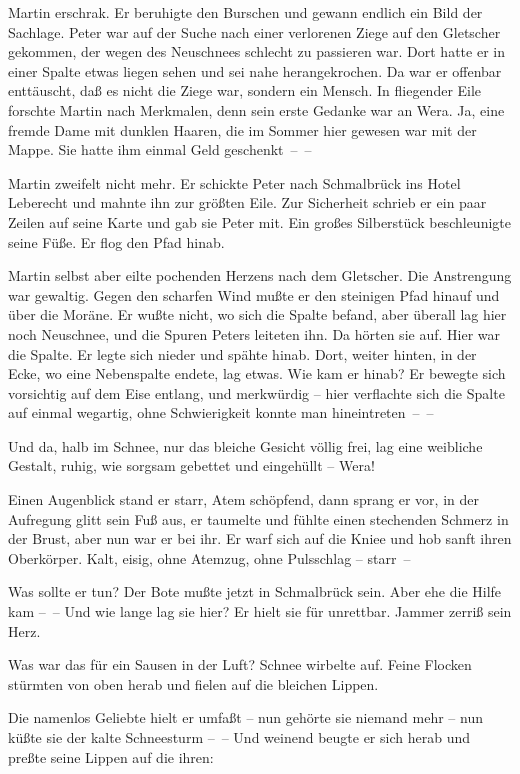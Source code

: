 Martin erschrak. Er beruhigte den Burschen und gewann endlich ein
Bild der Sachlage. Peter war auf der Suche nach einer verlorenen
Ziege auf den Gletscher gekommen, der wegen des Neuschnees schlecht
zu passieren war. Dort hatte er in einer Spalte etwas liegen sehen
und sei nahe herangekrochen. Da war er offenbar enttäuscht, daß es
nicht die Ziege war, sondern ein Mensch. In fliegender Eile
forschte Martin nach Merkmalen, denn sein erste Gedanke war an
Wera. Ja, eine fremde Dame mit dunklen Haaren, die im Sommer hier
gewesen war mit der Mappe. Sie hatte ihm einmal Geld geschenkt~–~–

Martin zweifelt nicht mehr. Er schickte Peter nach Schmalbrück ins
Hotel Leberecht und mahnte ihn zur größten Eile. Zur Sicherheit
schrieb er ein paar Zeilen auf seine Karte und gab sie Peter mit.
Ein großes Silberstück beschleunigte seine Füße. Er flog den Pfad
hinab.

Martin selbst aber eilte pochenden Herzens nach dem Gletscher. Die
Anstrengung war gewaltig. Gegen den scharfen Wind mußte er den
steinigen Pfad hinauf und über die Moräne. Er wußte nicht, wo sich
die Spalte befand, aber überall lag hier noch Neuschnee, und die
Spuren Peters leiteten ihn. Da hörten sie auf. Hier war die Spalte.
Er legte sich nieder und spähte hinab. Dort, weiter hinten, in der
Ecke, wo eine Nebenspalte endete, lag etwas. Wie kam er hinab? Er
bewegte sich vorsichtig auf dem Eise entlang, und merkwürdig – hier
verflachte sich die Spalte auf einmal wegartig, ohne Schwierigkeit
konnte man hineintreten~–~–

Und da, halb im Schnee, nur das bleiche Gesicht völlig frei, lag
eine weibliche Gestalt, ruhig, wie sorgsam gebettet und eingehüllt
– Wera!

Einen Augenblick stand er starr, Atem schöpfend, dann sprang er
vor, in der Aufregung glitt sein Fuß aus, er taumelte und fühlte
einen stechenden Schmerz in der Brust, aber nun war er bei ihr. Er
warf sich auf die Kniee und hob sanft ihren Oberkörper. Kalt,
eisig, ohne Atemzug, ohne Pulsschlag – starr~–

Was sollte er tun? Der Bote mußte jetzt in Schmalbrück sein. Aber
ehe die Hilfe kam –~– Und wie lange lag sie hier? Er hielt sie für
unrettbar. Jammer zerriß sein Herz.

Was war das für ein Sausen in der Luft? Schnee wirbelte auf. Feine
Flocken stürmten von oben herab und fielen auf die bleichen
Lippen.

Die namenlos Geliebte hielt er umfaßt – nun gehörte sie niemand
mehr – nun küßte sie der kalte Schneesturm –~– Und weinend beugte
er sich herab und preßte seine Lippen auf die ihren:

